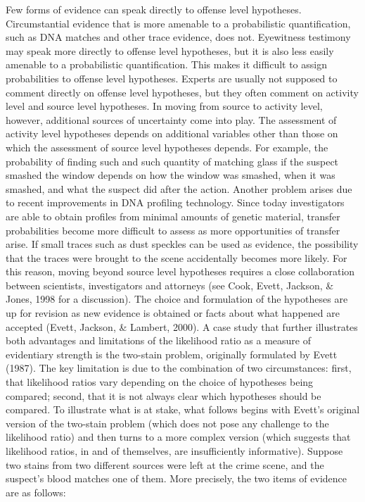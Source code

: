 \documentclass[
  10pt,
  dvipsnames,enabledeprecatedfontcommands]{scrartcl}
\begin{document}
Few forms of evidence can speak directly to offense level hypotheses.
Circumstantial evidence that is more amenable to a probabilistic
quantification, such as DNA matches and other trace evidence, does not.
Eyewitness testimony may speak more directly to offense level
hypotheses, but it is also less easily amenable to a probabilistic
quantification. This makes it difficult to assign probabilities to
offense level hypotheses. Experts are usually not supposed to comment
directly on offense level hypotheses, but they often comment on activity
level and source level hypotheses. In moving from source to activity
level, however, additional sources of uncertainty come into play. The
assessment of activity level hypotheses depends on additional variables
other than those on which the assessment of source level hypotheses
depends. For example, the probability of finding such and such quantity
of matching glass if the suspect smashed the window depends on how the
window was smashed, when it was smashed, and what the suspect did after
the action. Another problem arises due to recent improvements in DNA
profiling technology. Since today investigators are able to obtain
profiles from minimal amounts of genetic material, transfer
probabilities become more difficult to assess as more opportunities of
transfer arise. If small traces such as dust speckles can be used as
evidence, the possibility that the traces were brought to the scene
accidentally becomes more likely. For this reason, moving beyond source
level hypotheses requires a close collaboration between scientists,
investigators and attorneys (see Cook, Evett, Jackson, \& Jones, 1998
for a discussion). The choice and formulation of the hypotheses are up
for revision as new evidence is obtained or facts about what happened
are accepted (Evett, Jackson, \& Lambert, 2000). A case study that
further illustrates both advantages and limitations of the likelihood
ratio as a measure of evidentiary strength is the two-stain problem,
originally formulated by Evett (1987). The key limitation is due to the
combination of two circumstances: first, that likelihood ratios vary
depending on the choice of hypotheses being compared; second, that it is
not always clear which hypotheses should be compared. To illustrate what
is at stake, what follows begins with Evett's original version of the
two-stain problem (which does not pose any challenge to the likelihood
ratio) and then turns to a more complex version (which suggests that
likelihood ratios, in and of themselves, are insufficiently
informative). Suppose two stains from two different sources were left at
the crime scene, and the suspect's blood matches one of them. More
precisely, the two items of evidence are as follows: \vspace{2mm}
\end{document}
